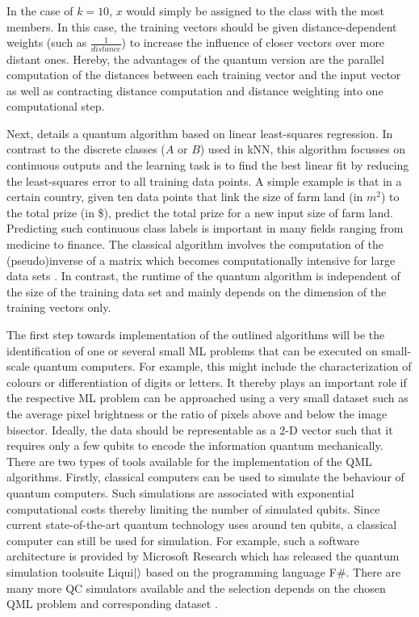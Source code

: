 \documentclass[a4paper]{article}
\newcommand*{\0}{$\ket{0}$}
\newcommand*{\1}{$\ket{1}$}
\begin{document}

In the case of $k = 10$, $x$ would simply be assigned to the class with the most members. In this case, the training vectors should be given distance-dependent weights (such as $\frac{1}{distance}$) to increase the influence of closer vectors over more distant ones. Hereby, the advantages of the quantum version are the parallel computation of the distances between each training vector and the input vector as well as contracting distance computation and distance weighting into one computational step.

Next, \cite{Schuld2016} details a quantum algorithm based on linear least-squares regression. In contrast to the discrete classes ($A$ or $B$) used in kNN, this algorithm focusses on continuous outputs and the learning task is to find the best linear fit by reducing the least-squares error to all training data points. A simple example is that in a certain country, given ten data points that link the size of farm land (in ${m}^{2}$) to the total prize (in \$), predict the total prize for a new input size of farm land. Predicting such continuous class labels is important in many fields ranging from medicine to finance. The classical algorithm involves the computation of the (pseudo)inverse of a matrix which becomes computationally intensive for large data sets \citep{decell1975generalized}. In contrast, the runtime of the quantum algorithm is independent of the size of the training data set and mainly depends on the dimension of the training vectors only.

The first step towards implementation of the outlined algorithms will be the identification of one or several small ML problems that can be executed on small-scale quantum computers. For example, this might include the characterization of colours or differentiation of digits or letters. It thereby plays an important role if the respective ML problem can be approached using a very small dataset such as the average pixel brightness or the ratio of pixels above and below the image bisector. Ideally, the data should be representable as a 2-D vector such that it requires only a few qubits to encode the information quantum mechanically.
\newpage
There are two types of tools available for the implementation of the QML algorithms. Firstly, classical computers can be used to simulate the behaviour of quantum computers. Such simulations are associated with exponential computational costs thereby limiting the number of simulated qubits. Since current state-of-the-art quantum technology uses around ten qubits, a classical computer can still be used for simulation. For example, such a software architecture is provided by Microsoft Research which has released the quantum simulation toolsuite Liqui$\ket{}$ based on the programming language F\#. There are many more QC simulators available and the selection depends on the chosen QML problem and corresponding dataset \citep{quantiki}.
\end{document}
